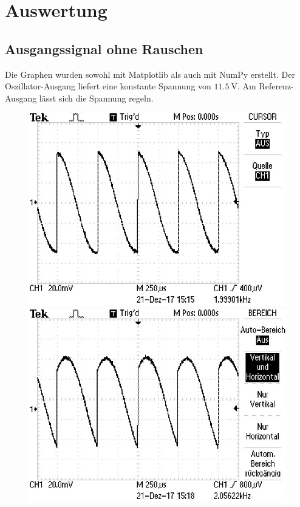 \section{Auswertung}
\label{sec:Auswertung}


\subsection{Ausgangssignal ohne Rauschen}
\label{sec:oR}
Die Graphen wurden sowohl mit Matplotlib \cite{matplotlib} als auch mit NumPy \cite{numpy} erstellt.
Der Oszillator-Ausgang liefert eine konstante Spannung von $\SI{11,5}{\volt}$.
Am Referenz-Ausgang lässt sich die Spannung regeln.

\begin{figure}
\centering
\begin{minipage}{0.48\textwidth}
\centering
{}
\includegraphics[scale=.75]{content/images/00.jpg}
\end{minipage}
\begin{minipage}{0.48\textwidth}
\centering
{}
\includegraphics[scale=.75]{content/images/45.jpg}
\end{minipage}


\end{figure}
